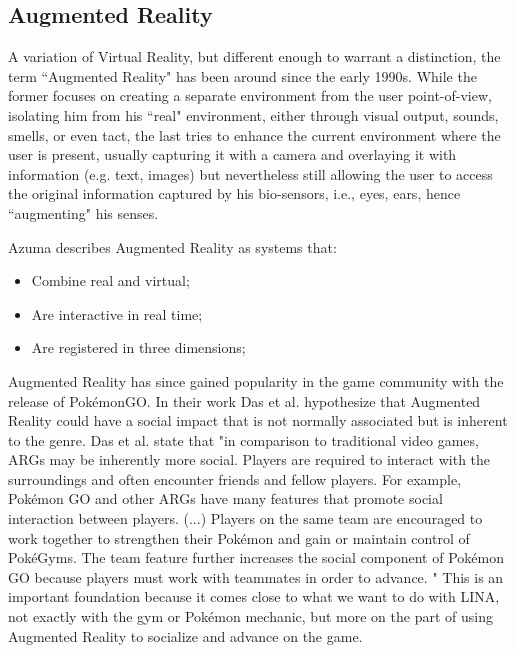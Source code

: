 \subsection{Augmented Reality}
\par A variation of Virtual Reality, but different enough to warrant a distinction, the term ``Augmented Reality" has been around since the early 1990s. While the former focuses on creating a separate environment from the user point-of-view, isolating him from his ``real" environment, either through visual output, sounds, smells, or even tact, the last tries to enhance the current environment where the user is present, usually capturing it with a camera and overlaying it with information (e.g. text, images) but nevertheless still allowing the user to access the original information captured by his bio-sensors, i.e., eyes, ears, hence ``augmenting" his senses. \cite{sutherland_1968}
\par Azuma describes Augmented Reality as systems that: \cite{azuma_1997}
\begin{itemize}
    \item Combine real and virtual;
    \item Are interactive in real time;
    \item Are registered in three dimensions;
\end{itemize}

\par Augmented Reality has since gained popularity in the game community with the release of PokémonGO. In their work Das et al. hypothesize that Augmented Reality could have a social impact that is not normally associated but is inherent to the genre. Das et al. state that "in comparison to traditional video games, ARGs may be inherently more social.  Players are required to interact with the surroundings and often encounter friends and fellow players. For example, Pokémon GO and other ARGs have many features that promote social interaction between players. (...) Players on the same team are encouraged to work together to strengthen their Pokémon and gain or maintain control of PokéGyms. The team feature further increases the social component of Pokémon  GO  because  players  must  work  with  teammates  in  order  to  advance. " \cite{das_zhu_mclaughlin_bilgrami_milanaik_2017} This is an important foundation because it comes close to what we want to do with LINA, not exactly with the gym or Pokémon mechanic, but more on the part of using Augmented Reality to socialize and advance on the game. 


